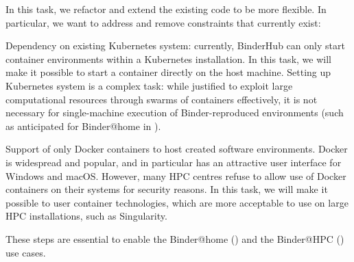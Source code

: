\begin{task}[
  title=Reducing technical constraints to enable broader usage,
  id=constraints,
  lead=SRL,
  PM=14,
  partners={MP,QS}
]

In this task, we refactor and extend the existing code to be more flexible. In
particular, we want to address and remove constraints that currently exist:

\begin{compactitem}
\item Dependency on existing Kubernetes system: currently, BinderHub can
  only start container environments within a Kubernetes installation. In this
  task, we will make it possible to start a container directly on the host
  machine. Setting up Kubernetes system is a complex task: while justified to
  exploit large computational resources through swarms of containers
  effectively, it is not necessary for single-machine execution of
  Binder-reproduced environments (such as anticipated for Binder@home in
  ).
\item Support of only Docker containers to host created software environments.
  Docker is widespread and popular, and in particular has an attractive user
  interface for Windows and macOS. However, many HPC centres refuse to allow use
  of Docker containers on their systems for security reasons. In this task, we
  will make it possible to user container technologies, which are more
  acceptable to use on large HPC installations, such as Singularity.
  \end{compactitem}

  These steps are essential to enable the Binder@home
  () and the Binder@HPC
  () use cases.

\end{task}
